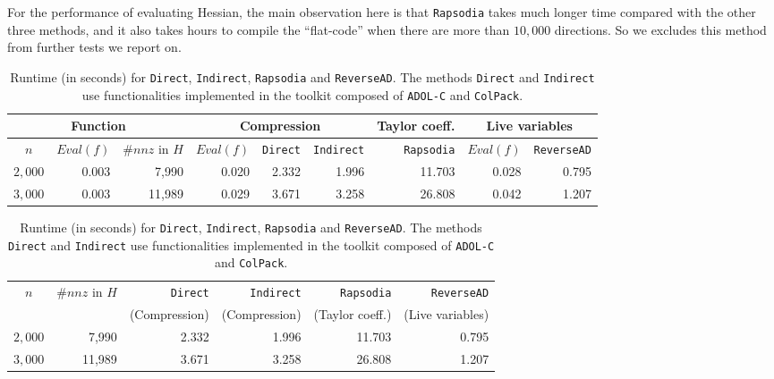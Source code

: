 \documentclass[10pt, a4paper, english]{article}
\begin{document}
For the performance of evaluating Hessian, the main observation here is that {\tt Rapsodia} takes much longer time compared with the other three methods, and it also takes hours to compile the ``flat-code'' when there are more than $10,000$ directions. 
So we excludes this method from further tests we report on.
\begin{table}[htbp]
\begin{center}
\begin{tabular}{ | c | r | r | r | r | r | r | r | r |}
\hline
\multicolumn{3}{|c|}{Function} & \multicolumn{3}{|c|}{{Compression}} & Taylor coeff.  & \multicolumn{2}{|c|}{Live variables} \\
\hline
$n$ & $Eval(f)$ & $\#nnz$ in $H$ & $Eval(f)$ &{\tt Direct} & {\tt Indirect} & {\tt Rapsodia} & $Eval(f)$ & {\tt ReverseAD} \\
\hline
$2,000$ & 0.003  & 7,990 & 0.020 & 2.332 & 1.996 & 11.703 & 0.028 & 0.795 \\
$3,000$ & 0.003 & 11,989 & 0.029 & 3.671 & 3.258 & 26.808 & 0.042 & 1.207\\
\hline 
\end{tabular}
\end{center}
\caption{Runtime (in seconds) for {\tt Direct}, {\tt Indirect}, {\tt Rapsodia} and {\tt ReverseAD}. The methods {\tt Direct} and {\tt Indirect} use functionalities implemented in the toolkit composed of {\tt ADOL-C} and {\tt ColPack}.} 
\label{tab:general}
\end{table}

\begin{table}[htbp]
\begin{center}
\begin{tabular}{ | c | r | r | r | r | r |}
\hline
$n$ & $\#nnz$ in $H$ & {\tt Direct} & {\tt Indirect} & {\tt Rapsodia} & {\tt ReverseAD} \\
       &                          & (Compression) & (Compression) & (Taylor coeff.) & (Live variables) \\ 
\hline
$2,000$ & 7,990 & 2.332 & 1.996 & 11.703 & 0.795 \\
$3,000$ & 11,989 & 3.671 & 3.258 & 26.808 & 1.207\\
\hline 
\end{tabular}
\end{center}
\caption{Runtime (in seconds) for {\tt Direct}, {\tt Indirect}, {\tt Rapsodia} and {\tt ReverseAD}. The methods {\tt Direct} and {\tt Indirect} use functionalities implemented in the toolkit composed of {\tt ADOL-C} and {\tt ColPack}.} 
\label{tab:general}
\end{table}
\end{document}
